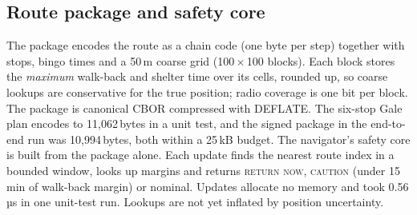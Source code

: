 \subsection{Route package and safety core}
\label{sec:package}
The package encodes the route as a chain code (one byte per step) together with stops, bingo times and a 50\,m coarse grid (100\,$\times$\,100 blocks). Each block stores the \emph{maximum} walk-back and shelter time over its cells, rounded up, so coarse lookups are conservative for the true position; radio coverage is one bit per block. The package is canonical CBOR compressed with DEFLATE. The six-stop Gale plan encodes to 11,062\,bytes in a unit test, and the signed package in the end-to-end run was 10,994\,bytes, both within a 25\,kB budget. The navigator's safety core is built from the package alone. Each update finds the nearest route index in a bounded window, looks up margins and returns \textsc{return now}, \textsc{caution} (under 15\,min of walk-back margin) or nominal. Updates allocate no memory and took 0.56\,µs in one unit-test run. Lookups are not yet inflated by position uncertainty.
